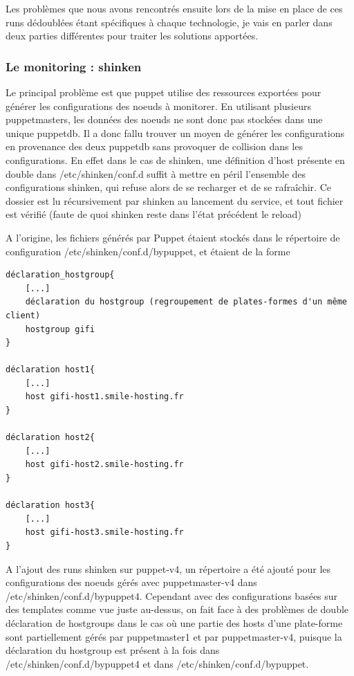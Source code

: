 \documentclass[14 pt,a4paper]{extreport}
\begin{document}
Les problèmes que nous avons rencontrés ensuite lors de la mise en place de ces runs dédoublées étant spécifiques à chaque technologie, je vais en parler dans deux parties différentes pour traiter les solutions apportées.

\subsubsection{Le monitoring : shinken}

Le principal problème est que puppet utilise des ressources exportées pour générer les configurations des noeuds à monitorer. En utilisant plusieurs puppetmasters, les données des noeuds ne sont donc pas stockées dans une unique puppetdb. Il a donc fallu trouver un moyen de générer les configurations en provenance des deux puppetdb sans provoquer de collision dans les configurations. En effet dans le cas de shinken, une définition d'host présente en double dans /etc/shinken/conf.d suffit à mettre en péril l'ensemble des configurations shinken, qui refuse alors de se recharger et de se rafraîchir. Ce dossier est lu récursivement par shinken au lancement du service, et tout fichier est vérifié (faute de quoi shinken reste dans l'état précédent le reload)

A l'origine, les fichiers générés par Puppet étaient stockés dans le répertoire de configuration /etc/shinken/conf.d/bypuppet, et étaient de la forme

\begin{Verbatim}[fontsize=\scriptsize]
déclaration_hostgroup{
	[...]
	déclaration du hostgroup (regroupement de plates-formes d'un même client)
	hostgroup gifi
}

déclaration host1{
	[...]
	host gifi-host1.smile-hosting.fr
}

déclaration host2{
	[...]
	host gifi-host2.smile-hosting.fr
}

déclaration host3{
	[...]
	host gifi-host3.smile-hosting.fr
}
\end{Verbatim}

A l'ajout des runs shinken sur puppet-v4, un répertoire a été ajouté pour les configurations des noeuds gérés avec puppetmaster-v4 dans /etc/shinken/conf.d/bypuppet4. Cependant avec des configurations basées sur des templates comme vue juste au-dessus, on fait face à des problèmes de double déclaration de hostgroups dans le cas où une partie des hosts d'une plate-forme sont partiellement gérés par puppetmaster1 et par puppetmaster-v4, puisque la déclaration du hostgroup est présent à la fois dans /etc/shinken/conf.d/bypuppet4 et dans /etc/shinken/conf.d/bypuppet.
\end{document}
